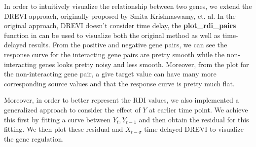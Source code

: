 \documentclass[10pt,oneside]{article}\usepackage[]{graphicx}\usepackage[]{color}
\begin{document}
In order to intuitively visualize the relationship between two genes, we extend the DREVI approach, originally proposed by Smita Krishnaswamy, et. al. In the original approach, DREVI doesn't consider time delay, the \textbf{plot\_rdi\_pairs} function in  can be used to visualize both the original  method as well as time-delayed  results. From the positive and negative gene pairs, we can see the response curve for the interacting gene pairs are pretty smooth while the non-interacting genes looks pretty noisy and less smooth. Moreover, from the  plot for the non-interacting gene pair, a give target value can have many more corresponding source values and that the response curve is pretty much flat.

Moreover, in order to better represent the RDI values, we also implemented a generalized approach to consider the effect of $Y$ at earlier time point. We achieve this first by fitting a curve between $Y_t, Y_{t - 1}$ and then obtain the residual for this fitting. We then plot these residual and $X_{t - \sigma}$ time-delayed DREVI to visualize the gene regulation.
\end{document}
